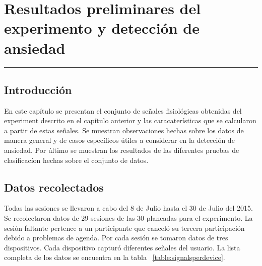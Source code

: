 
\chapter{Resultados preliminares del experimento y detecci\'on de ansiedad}\label{capit:cap4}
\vspace{-2.0325ex}%
\noindent
\rule{\textwidth}{0.5pt}
\vspace{-5.5ex}%
\newcommand{\pushline}{\Indp}%

\section{Introducci\'on}\label{cap4:intro}
En este cap\'itulo se presentan el conjunto de se\~nales fisiol\'ogicas obtenidas del experiment descrito en el cap\'itulo anterior y las caracater\'isticas que se calcularon a partir de estas se\~nales. Se muestran observaciones hechas sobre los datos de manera general y de casos espec\'ificos \'utiles a considerar en la detecci\'on de ansiedad. Por \'ultimo se muestran los resultados de las diferentes pruebas de clasificac\'ion hechas sobre el conjunto de datos.

\section{Datos recolectados}
Todas las sesiones se llevaron a cabo del 8 de Julio hasta el 30 de Julio del 2015. Se recolectaron datos de 29 sesiones de las 30 planeadas para el experimento. La sesi\'on faltante pertence a un participante que cancel\'o su tercera participaci\'on debido a problemas de agenda. Por cada sesi\'on se tomaron datos de tres dispositivos. Cada dispositivo captur\'o diferentes se\~nales del usuario. La lista completa de los datos se encuentra en la tabla ~\ref{table:signalsperdevice}.

